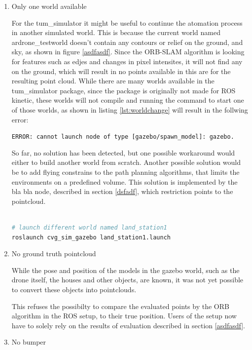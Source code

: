 	\begin{enumerate}
	
	\item{Only one world available}
	
	For the tum\_simulator it might be useful to continue the atomation process in another simulated world. This is because the current world named ardrone\_testworld
	doesn't contain any contours or relief on the ground, and sky, as shown in figure \ref{asdfasdf}. Since the ORB-SLAM algorithm is looking for features such as edjes and changes in pixel intensites, 
	it will not find any on the ground, which will result in no points available in this are for the resulting point cloud. While there are many worlds available in the 
	tum\_simulator package, since the package is originally not made for ROS kinetic, these worlds will not compile and running the command to start one of those worlds, 
	as shown in listing \ref{lst:worldchange} will result in the follwing error: 
	
	\texttt{ERROR: cannot launch node of type [gazebo/spawn\_model]: gazebo.}
	
	So far, no solution has been detected, but one possible workaround would either to build another world from scratch. Another possible solution would be to add flying 
	constrains to the path planning algorithms, that limits the environments on a predefined volume. This solution is implemented by the bla bla node, described in section 
	\ref{dsfadf}, which restriction points to the pointcloud. 
	
	
\begin{lstlisting}[language=bash, caption=launching different world, label=lst:worldchange]
	
# launch different world named land_station1
roslaunch cvg_sim_gazebo land_station1.launch

\end{lstlisting}

	\item{No ground truth pointcloud}
	
	While the pose and position of the models in the gazebo world, such as the drone itself, the houses and other objects, are known, it was not yet possible 
	to convert these objects into pointclouds. 
	
	
	This refuses the possibilty to compare the evaluated points by the ORB algorithm in the ROS setup, to their true position. Users of the setup now have to solely
	rely on the results of evaluation described in section \ref{asdfasdf}.
	
	\item{No bumper}

	\end{enumerate}